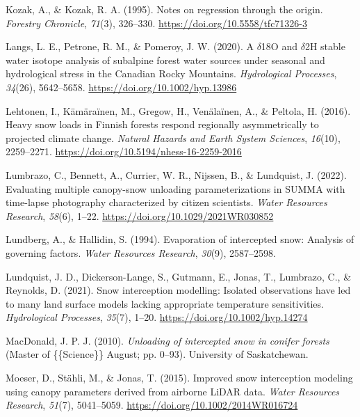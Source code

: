 \documentclass[
  letterpaper,
  DIV=11,
  numbers=noendperiod]{scrartcl}
\newlength{\cslhangindent}
\newenvironment{CSLReferences}[2] %
 {\begin{list}{}{%
  \setlength{\itemindent}{0pt}
  \setlength{\leftmargin}{0pt}
  \setlength{\parsep}{0pt}
  \ifodd #1
   \setlength{\leftmargin}{\cslhangindent}
   \setlength{\itemindent}{-1\cslhangindent}
  \fi
  \setlength{\itemsep}{#2\baselineskip}}}
 {\end{list}}
\begin{document}
\begin{CSLReferences}{1}{0}
Kozak, A., \& Kozak, R. A. (1995). Notes on regression through the
origin. \emph{Forestry Chronicle}, \emph{71}(3), 326--330.
\url{https://doi.org/10.5558/tfc71326-3}

Langs, L. E., Petrone, R. M., \& Pomeroy, J. W. (2020). A
{\(\delta\)}{18O} and {\(\delta\)}{2H} stable water isotope analysis of
subalpine forest water sources under seasonal and hydrological stress in
the {Canadian Rocky Mountains}. \emph{Hydrological Processes},
\emph{34}(26), 5642--5658. \url{https://doi.org/10.1002/hyp.13986}

Lehtonen, I., Kämäraïnen, M., Gregow, H., Venälaïnen, A., \& Peltola, H.
(2016). Heavy snow loads in {Finnish} forests respond regionally
asymmetrically to projected climate change. \emph{Natural Hazards and
Earth System Sciences}, \emph{16}(10), 2259--2271.
\url{https://doi.org/10.5194/nhess-16-2259-2016}

Lumbrazo, C., Bennett, A., Currier, W. R., Nijssen, B., \& Lundquist, J.
(2022). Evaluating multiple canopy-snow unloading parameterizations in
{SUMMA} with time-lapse photography characterized by citizen scientists.
\emph{Water Resources Research}, \emph{58}(6), 1--22.
\url{https://doi.org/10.1029/2021WR030852}

Lundberg, A., \& Hallidin, S. (1994). Evaporation of intercepted snow:
{Analysis} of governing factors. \emph{Water Resources Research},
\emph{30}(9), 2587--2598.

Lundquist, J. D., Dickerson-Lange, S., Gutmann, E., Jonas, T., Lumbrazo,
C., \& Reynolds, D. (2021). Snow interception modelling: {Isolated}
observations have led to many land surface models lacking appropriate
temperature sensitivities. \emph{Hydrological Processes}, \emph{35}(7),
1--20. \url{https://doi.org/10.1002/hyp.14274}

MacDonald, J. P. J. (2010). \emph{Unloading of intercepted snow in
conifer forests} (Master of \{\{Science\}\} August; pp. 0--93).
University of Saskatchewan.

Moeser, D., Stähli, M., \& Jonas, T. (2015). Improved snow interception
modeling using canopy parameters derived from airborne {LiDAR} data.
\emph{Water Resources Research}, \emph{51}(7), 5041--5059.
\url{https://doi.org/10.1002/2014WR016724}


\end{CSLReferences}
\end{document}
